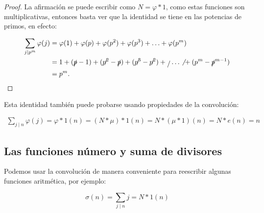 \begin{proof}
La afirmación se puede  escribir como $N=\varphi*1$, como estas funciones son multiplicativas, entonces basta ver que la identidad se tiene en las potencias de primos, en efecto:

\begin{align*}
    \sum_{j\mid p^m}\varphi(j)&=\varphi(1)+\varphi(p)+\varphi(p^2)+\varphi(p^3)+\ldots+\varphi(p^m)\\
    &=1+(\slashed{p}-1)+(\slashed{p^2}-\slashed{p})+(\slashed{p^3}-\slashed{p^2})+\slashed{ } \ldots\not{ } +(p^m-\slashed p^{m-1})\\
    &=p^m
.\end{align*}
\end{proof}

Esta identidad  también puede probarse usando propiedades  de la convolución:

\begin{align*}
    \sum_{j\mid n}\varphi(j)=\varphi*1(n)=(N*\mu)*1(n)=N*(\mu*1)(n)=N*e(n)=n
\end{align*}

\subsection{Las funciones número y suma de divisores}

Podemos usar la convolución de manera conveniente para reescribir algunas funciones aritmética, por ejemplo:

$$\sigma(n)=\sum_{j\mid n}j=N*1(n)$$

